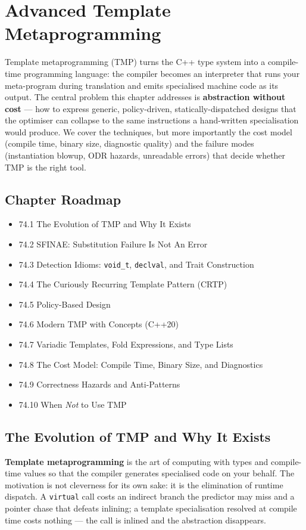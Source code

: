 \chapter{Advanced Template Metaprogramming}

Template metaprogramming (TMP) turns the C++ type system into a compile-time programming language: the compiler becomes an interpreter that runs your meta-program during translation and emits specialised machine code as its output. The central problem this chapter addresses is \textbf{abstraction without cost} --- how to express generic, policy-driven, statically-dispatched designs that the optimiser can collapse to the same instructions a hand-written specialisation would produce. We cover the techniques, but more importantly the cost model (compile time, binary size, diagnostic quality) and the failure modes (instantiation blowup, ODR hazards, unreadable errors) that decide whether TMP is the right tool.

\section*{Chapter Roadmap}
\begin{itemize}
\item 74.1 The Evolution of TMP and Why It Exists
\item 74.2 SFINAE: Substitution Failure Is Not An Error
\item 74.3 Detection Idioms: \texttt{void\_t}, \texttt{declval}, and Trait Construction
\item 74.4 The Curiously Recurring Template Pattern (CRTP)
\item 74.5 Policy-Based Design
\item 74.6 Modern TMP with Concepts (C++20)
\item 74.7 Variadic Templates, Fold Expressions, and Type Lists
\item 74.8 The Cost Model: Compile Time, Binary Size, and Diagnostics
\item 74.9 Correctness Hazards and Anti-Patterns
\item 74.10 When \emph{Not} to Use TMP
\end{itemize}

\section{The Evolution of TMP and Why It Exists}

\textbf{Template metaprogramming} is the art of computing with types and compile-time values so that the compiler generates specialised code on your behalf. The motivation is not cleverness for its own sake: it is the elimination of runtime dispatch. A \texttt{virtual} call costs an indirect branch the predictor may miss and a pointer chase that defeats inlining; a template specialisation resolved at compile time costs nothing --- the call is inlined and the abstraction disappears.

